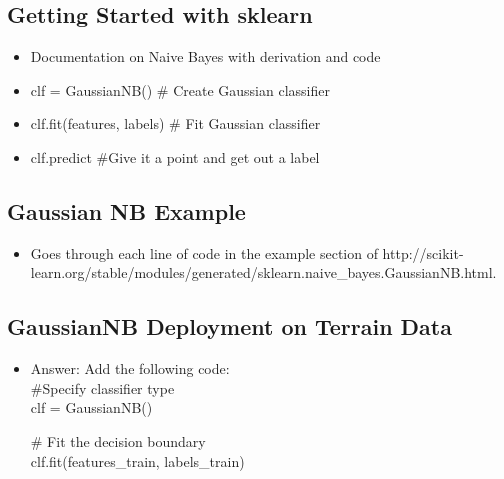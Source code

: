 \documentclass[12pt]{report}
\begin{document}
\subsection{Getting Started with sklearn}

\begin{itemize}

\item Documentation on Naive Bayes with derivation and code 

\item clf = GaussianNB() \# Create Gaussian classifier

\item clf.fit(features, labels) \# Fit Gaussian classifier

\item clf.predict \#Give it a point and get out a label

\end{itemize}

\subsection{Gaussian NB Example}

\begin{itemize}

\item Goes through each line of code in the example section of http://scikit-learn.org/stable/modules/generated/sklearn.naive\_bayes.GaussianNB.html. 

\end{itemize}

\subsection{GaussianNB Deployment on Terrain Data}

\begin{itemize}

\item Answer: Add the following code: \\

\#Specify classifier type \\
clf = GaussianNB() \\

\bigskip

\# Fit the decision boundary \\
clf.fit(features\_train, labels\_train) \\

\end{itemize}
\end{document}
